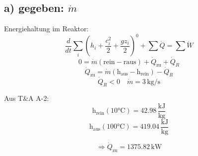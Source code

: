 \subsection*{a) gegeben: \( \dot{m} \)}

Energiehaltung im Reaktor:
\[
\frac{d}{dt} \sum_i (h_i + \frac{c_i^2}{2} + \frac{g z_i}{2})^0 + \sum \dot{Q} = \sum \dot{W}
\]
\[
0 = \dot{m} (\text{rein} - \text{raus}) + \dot{Q}_{\text{zu}} + \dot{Q}_R
\]
\[
\dot{Q}_{\text{zu}} = \dot{m} (\text{h}_{\text{aus}} - \text{h}_{\text{rein}}) - \dot{Q}_R
\]
\[
\dot{Q}_R < 0 \quad \dot{m} = 3 \, \text{kg/s}
\]

Aus T\&A A-2:
\[
\text{h}_{\text{rein}} (\text{10°C}) = 42.98 \, \frac{\text{kJ}}{\text{kg}}
\]
\[
\text{h}_{\text{aus}} (\text{100°C}) = 419.04 \, \frac{\text{kJ}}{\text{kg}}
\]

\[
\Rightarrow \dot{Q}_{\text{zu}} = 1375.82 \, \text{kW}
\]